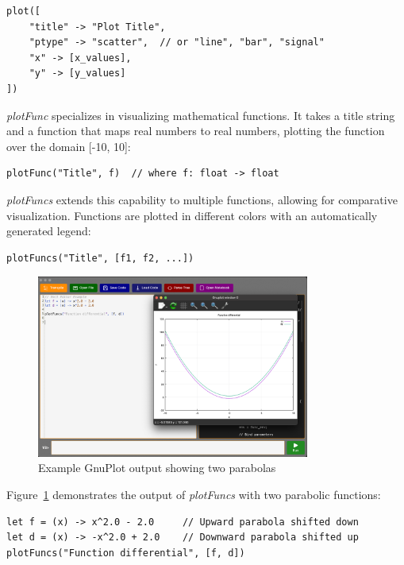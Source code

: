 \begin{verbatim}
plot([
    "title" -> "Plot Title",
    "ptype" -> "scatter",  // or "line", "bar", "signal"
    "x" -> [x_values],
    "y" -> [y_values]
])
\end{verbatim}

\textit{plotFunc} specializes in visualizing mathematical functions. It takes a title string and a function that maps real numbers to real numbers, plotting the function over the domain [-10, 10]:

\begin{verbatim}
plotFunc("Title", f)  // where f: float -> float
\end{verbatim}

\textit{plotFuncs} extends this capability to multiple functions, allowing for comparative visualization. Functions are plotted in different colors with an automatically generated legend:

\begin{verbatim}
plotFuncs("Title", [f1, f2, ...])
\end{verbatim}

\begin{figure}[H]
    \centering
    \includegraphics[width=0.8\textwidth]{assets/gnuplot.png}
    \caption{Example GnuPlot output showing two parabolas}\label{fig:gnuplot-example}
\end{figure}

Figure~\ref{fig:gnuplot-example} demonstrates the output of \textit{plotFuncs} with two parabolic functions:

\begin{verbatim}
let f = (x) -> x^2.0 - 2.0     // Upward parabola shifted down
let d = (x) -> -x^2.0 + 2.0    // Downward parabola shifted up
plotFuncs("Function differential", [f, d])
\end{verbatim}

